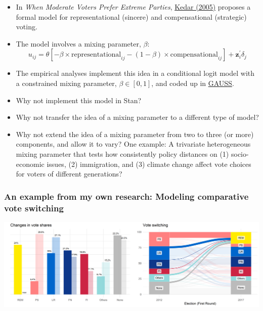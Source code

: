 \documentclass[
  11pt,
]{article}
\providecommand{\tightlist}{%
  \setlength{\itemsep}{0pt}\setlength{\parskip}{0pt}}
\begin{document}
\begin{itemize}
\tightlist
\item
  In \emph{When Moderate Voters Prefer Extreme Parties}, \href{https://www.cambridge.org/core/journals/american-political-science-review/article/when-moderate-voters-prefer-extreme-parties-policy-balancingin-parliamentary-elections/A6729F56D47DDD3993DD3CA02840B6B0}{Kedar (2005)} proposes a formal model for representational (sincere) and compensational (strategic) voting.
\item
  The model involves a mixing parameter, \(\beta\): \[u_{ij} = \theta [-\beta \times \text{representational}_{ij} - (1 - \beta) \times \text{compensational}_{ij}] + \mathbf{z}_{i}^{\prime}\delta_j \]
\item
  The empirical analyses implement this idea in a conditional logit model with a constrained mixing parameter, \(\beta \in [0,1]\), and coded up in \href{https://en.wikipedia.org/wiki/GAUSS_(software)}{GAUSS}.
\item
  Why not implement this model in Stan?
\item
  Why not transfer the idea of a mixing parameter to a different type of model?
\item
  Why not extend the idea of a mixing parameter from two to three (or more) components, and allow it to vary? One example: A trivariate heterogeneous mixing parameter that tests how consistently policy distances on (1) socio-economic issues, (2) immigration, and (3) climate change affect vote choices for voters of different generations?
\end{itemize}

\hypertarget{an-example-from-my-own-research-modeling-comparative-vote-switching}{%
\subsubsection{An example from my own research: Modeling comparative vote switching}\label{an-example-from-my-own-research-modeling-comparative-vote-switching}}

\begin{center}\includegraphics[width=0.9\linewidth]{images/fr17-plots-1} \end{center}
\end{document}
